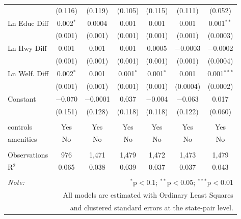 \begin{table}[!htbp]
\begin{tabular}{@{\extracolsep{5pt}}lcccccc}
  & (0.116) & (0.119) & (0.105) & (0.115) & (0.111) & (0.052) \\ 
  Ln Educ Diff & 0.002$^{*}$ & 0.0004 & 0.001 & 0.001 & 0.001 & 0.001$^{**}$ \\ 
  & (0.001) & (0.001) & (0.001) & (0.001) & (0.001) & (0.0003) \\ 
  Ln Hwy Diff & 0.001 & 0.001 & 0.001 & 0.0005 & $-$0.0003 & $-$0.0002 \\ 
  & (0.001) & (0.001) & (0.001) & (0.001) & (0.001) & (0.0004) \\ 
  Ln Welf. Diff & 0.002$^{*}$ & 0.001 & 0.001$^{*}$ & 0.001$^{*}$ & 0.001 & 0.001$^{***}$ \\ 
  & (0.001) & (0.001) & (0.001) & (0.001) & (0.0004) & (0.0002) \\ 
  Constant & $-$0.070 & $-$0.0001 & 0.037 & $-$0.004 & $-$0.063 & 0.017 \\ 
  & (0.151) & (0.128) & (0.118) & (0.118) & (0.122) & (0.060) \\ 
 \hline \\[-1.8ex] 
controls & Yes & Yes & Yes & Yes & Yes & Yes \\ 
amenities & No & No & No & No & No & No \\ 
\hline \\[-1.8ex] 
Observations & 976 & 1,471 & 1,479 & 1,472 & 1,473 & 1,479 \\ 
R$^{2}$ & 0.065 & 0.038 & 0.039 & 0.037 & 0.037 & 0.043 \\ 
\hline 
\hline \\[-1.8ex] 
\textit{Note:}  & \multicolumn{6}{r}{$^{*}$p$<$0.1; $^{**}$p$<$0.05; $^{***}$p$<$0.01} \\ 
 & \multicolumn{6}{r}{All models are estimated with Ordinary Least Squares} \\ 
 & \multicolumn{6}{r}{and clustered standard errors at the state-pair level.} \\ 
\end{tabular} 
\end{table} 
